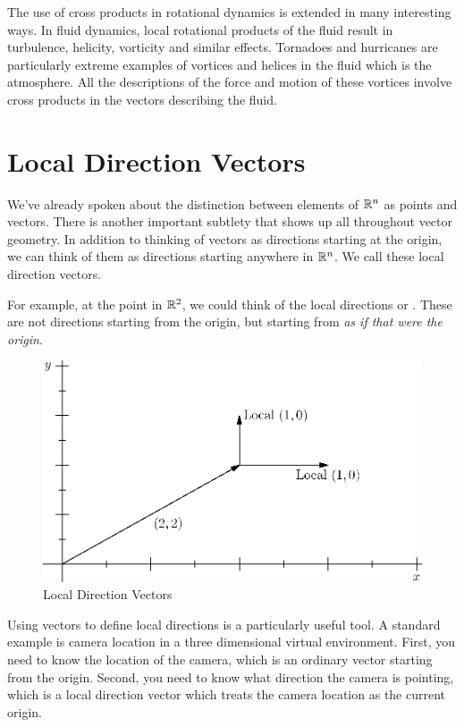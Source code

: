 \documentclass[fleqn,letterpaper]{report}
\begin{document}
The use of cross products in rotational dynamics is extended
in many interesting ways. In fluid dynamics, local rotational
products of the fluid result in turbulence, helicity,
vorticity and similar effects. Tornadoes and
hurricanes are particularly extreme examples of vortices and
helices in the fluid which is the atmosphere. All the
descriptions of the force and motion of these vortices involve
cross products in the vectors describing the fluid. 

\section{Local Direction Vectors}
\label{local-directions}

We've already spoken about the distinction between elements of
$\mathbb{R}^n$ as points and vectors. There is another important
subtlety that shows up all throughout vector geometry. In
addition to thinking of vectors as directions starting at the
origin, we can think of them as directions starting anywhere
in $\mathbb{R}^n$. We call these local direction vectors.

For example, at the point  in $\mathbb{R}^2$,
we could think of the local directions
 or
. These
are not directions starting from the origin, but starting from
 \emph{as if that were the
origin}. 

\begin{figure}[t]
\centering
\includegraphics[scale=1]{figure08.eps}
\caption{Local Direction Vectors}
\label{figure-local-direction-vecdtors}
\end{figure}

Using vectors to define local directions is a particularly
useful tool. A standard example is camera location in a three
dimensional virtual environment. First, you need to know the
location of the camera, which is an ordinary vector starting
from the origin. Second, you need to know what direction the
camera is pointing, which is a local direction vector which
treats the camera location as the current origin.
\end{document}
